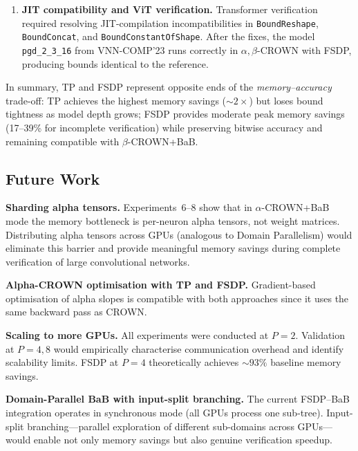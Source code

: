 \begin{enumerate}
    \item \textbf{JIT compatibility and ViT verification.}
    Transformer verification required resolving JIT-compilation incompatibilities
    in \texttt{BoundReshape}, \texttt{BoundConcat}, and
    \texttt{BoundConstantOfShape}. After the fixes, the model \texttt{pgd\_2\_3\_16}
    from VNN-COMP'23 runs correctly in $\alpha,\beta$-CROWN with FSDP, producing
    bounds identical to the reference.
\end{enumerate}

In summary, TP and FSDP represent opposite ends of the \textit{memory--accuracy}
trade-off: TP achieves the highest memory savings (${\sim}2\times$) but loses
bound tightness as model depth grows; FSDP provides moderate peak memory savings
(17--39\% for incomplete verification) while preserving bitwise accuracy and
remaining compatible with $\beta$-CROWN+BaB.

\subsection{Future Work}

\textbf{Sharding alpha tensors.}
Experiments~6--8 show that in $\alpha$-CROWN+BaB mode the memory bottleneck is
per-neuron alpha tensors, not weight matrices. Distributing alpha tensors across
GPUs (analogous to Domain Parallelism) would eliminate this barrier and provide
meaningful memory savings during complete verification of large convolutional
networks.

\textbf{Alpha-CROWN optimisation with TP and FSDP.}
Gradient-based optimisation of alpha slopes is compatible with both approaches
since it uses the same backward pass as CROWN.

\textbf{Scaling to more GPUs.}
All experiments were conducted at $P = 2$. Validation at $P = 4, 8$ would
empirically characterise communication overhead and identify scalability limits.
FSDP at $P = 4$ theoretically achieves ${\sim}93\%$ baseline memory savings.

\textbf{Domain-Parallel BaB with input-split branching.}
The current FSDP--BaB integration operates in synchronous mode (all GPUs
process one sub-tree). Input-split branching---parallel exploration of different
sub-domains across GPUs---would enable not only memory savings but also genuine
verification speedup.
